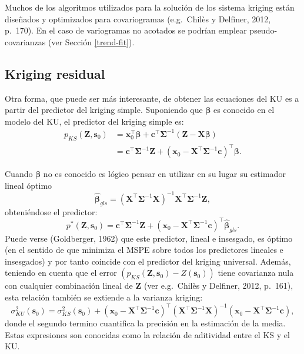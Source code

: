 \documentclass[
]{book}
\theoremstyle{break}
\theoremstyle{definition}
\theoremstyle{definition}
\theoremstyle{definition}
\theoremstyle{definition}
\theoremstyle{remark}
\begin{document}
Muchos de los algoritmos utilizados para la solución de los sistema kriging están diseñados y optimizados para covariogramas (e.g.~Chilès y Delfiner, 2012, p.~170).
En el caso de variogramas no acotados se podrían emplear pseudo-covarianzas (ver Sección \ref{trend-fit}).

\subsection{Kriging residual}\label{kriging-residual}

Otra forma, que puede ser más interesante, de obtener las ecuaciones del KU es a partir del predictor del kriging simple.
Suponiendo que \(\boldsymbol{\beta}\) es conocido en el modelo del KU, el predictor del kriging simple es:
\[\begin{aligned}
p_{KS} (\mathbf{Z},\mathbf{s}_{0})
& = \mathbf{x}_0^{\top}\boldsymbol{\beta} + \mathbf{c}^{\top} \boldsymbol{\Sigma}^{-1} \left( \mathbf{Z} - \mathbf{X}\boldsymbol{\beta} \right) \\
& =\mathbf{c^\top }\boldsymbol{\Sigma}^{-1}
\mathbf{Z}+(\mathbf{x}_0-\mathbf{X^\top }\boldsymbol{\Sigma}^{-1} \mathbf{c})^\top \boldsymbol{\beta}.
\end{aligned}\]

Cuando \(\boldsymbol{\beta}\) no es conocido es lógico pensar en utilizar en su lugar su estimador lineal óptimo
\[\hat{\boldsymbol{\beta}}_{gls} =(\mathbf{X}^{\top}\boldsymbol{\Sigma}^{-1} \mathbf{X})^{-1} \mathbf{X}^{\top}\boldsymbol{\Sigma}^{-1} \mathbf{Z},\]
obteniéndose el predictor:
\[p^{\ast}(\mathbf{Z},\mathbf{s}_{0}) = \mathbf{c^\top }\boldsymbol{\Sigma}^{-1}\mathbf{Z} + (\mathbf{x}_0-\mathbf{X}^\top\boldsymbol{\Sigma}^{-1} \mathbf{c})^\top \hat{\boldsymbol{\beta}}_{gls}.\]
Puede verse (Goldberger, 1962) que este predictor, lineal e insesgado, es óptimo (en el sentido de que minimiza el MSPE sobre todos los predictores lineales e insesgados) y por tanto coincide con el predictor del kriging universal.
Además, teniendo en cuenta que el error \(\left( p_{KS} (\mathbf{Z},\mathbf{s}_{0})-Z(\mathbf{s}_{0})\right)\) tiene covarianza nula con cualquier combinación lineal de \(\mathbf{Z}\) (ver e.g.~Chilès y Delfiner, 2012, p.~161), esta relación también se extiende a la varianza kriging:
\[\sigma_{KU}^{2} (\mathbf{s}_{0})=\sigma_{KS}^{2} (\mathbf{s}_{0}
)+(\mathbf{x}_0-\mathbf{X^\top }\boldsymbol{\Sigma}^{-1} \mathbf{c})^\top \left(
\mathbf{X^\top }\boldsymbol{\Sigma}^{-1} \mathbf{X}\right)^{-1}
(\mathbf{x}_0-\mathbf{X^\top }\boldsymbol{\Sigma}^{-1} \mathbf{c}),\]
donde el segundo termino cuantifica la precisión en la estimación de la media.
Estas expresiones son conocidas como la relación de aditividad entre el KS y el KU.
\end{document}
